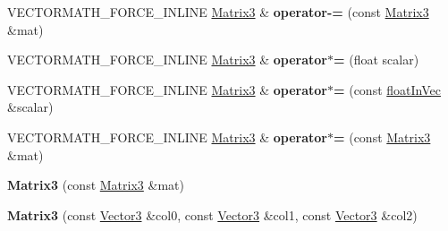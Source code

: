 \begin{DoxyCompactItemize}
\item 
\mbox{\label{classVectormath_1_1Aos_1_1Matrix3_a89abdf48eecd9bbcb786282ce3f89225}} 
V\+E\+C\+T\+O\+R\+M\+A\+T\+H\+\_\+\+F\+O\+R\+C\+E\+\_\+\+I\+N\+L\+I\+NE \hyperlink{classVectormath_1_1Aos_1_1Matrix3}{Matrix3} \& {\bfseries operator-\/=} (const \hyperlink{classVectormath_1_1Aos_1_1Matrix3}{Matrix3} \&mat)
\item 
\mbox{\label{classVectormath_1_1Aos_1_1Matrix3_a65e3b2b09e5c1b02a9252cd929583c1e}} 
V\+E\+C\+T\+O\+R\+M\+A\+T\+H\+\_\+\+F\+O\+R\+C\+E\+\_\+\+I\+N\+L\+I\+NE \hyperlink{classVectormath_1_1Aos_1_1Matrix3}{Matrix3} \& {\bfseries operator$\ast$=} (float scalar)
\item 
\mbox{\label{classVectormath_1_1Aos_1_1Matrix3_a5c44dba27c620623900342af63f49dd4}} 
V\+E\+C\+T\+O\+R\+M\+A\+T\+H\+\_\+\+F\+O\+R\+C\+E\+\_\+\+I\+N\+L\+I\+NE \hyperlink{classVectormath_1_1Aos_1_1Matrix3}{Matrix3} \& {\bfseries operator$\ast$=} (const \hyperlink{classVectormath_1_1floatInVec}{float\+In\+Vec} \&scalar)
\item 
\mbox{\label{classVectormath_1_1Aos_1_1Matrix3_a73b9c8c48d0f0039582e3f806338173e}} 
V\+E\+C\+T\+O\+R\+M\+A\+T\+H\+\_\+\+F\+O\+R\+C\+E\+\_\+\+I\+N\+L\+I\+NE \hyperlink{classVectormath_1_1Aos_1_1Matrix3}{Matrix3} \& {\bfseries operator$\ast$=} (const \hyperlink{classVectormath_1_1Aos_1_1Matrix3}{Matrix3} \&mat)
\item 
\mbox{\label{classVectormath_1_1Aos_1_1Matrix3_ad40ce9469c3eb035e45955e197fb2f69}} 
{\bfseries Matrix3} (const \hyperlink{classVectormath_1_1Aos_1_1Matrix3}{Matrix3} \&mat)
\item 
\mbox{\label{classVectormath_1_1Aos_1_1Matrix3_a47c615a84dc76eec1c638a6f4641faf3}} 
{\bfseries Matrix3} (const \hyperlink{classVectormath_1_1Aos_1_1Vector3}{Vector3} \&col0, const \hyperlink{classVectormath_1_1Aos_1_1Vector3}{Vector3} \&col1, const \hyperlink{classVectormath_1_1Aos_1_1Vector3}{Vector3} \&col2)
\item 
\mbox{\label{classVectormath_1_1Aos_1_1Matrix3_a255d5b94622e38e8ae4969aacc284dfe}} 

\end{DoxyCompactItemize}
